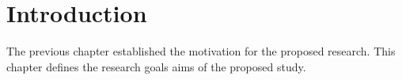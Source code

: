 
\section{Introduction}
\label{sec:research_objectives_introduction}
The previous chapter established the motivation for the proposed research.
This chapter defines the research goals aims of the proposed study. 
